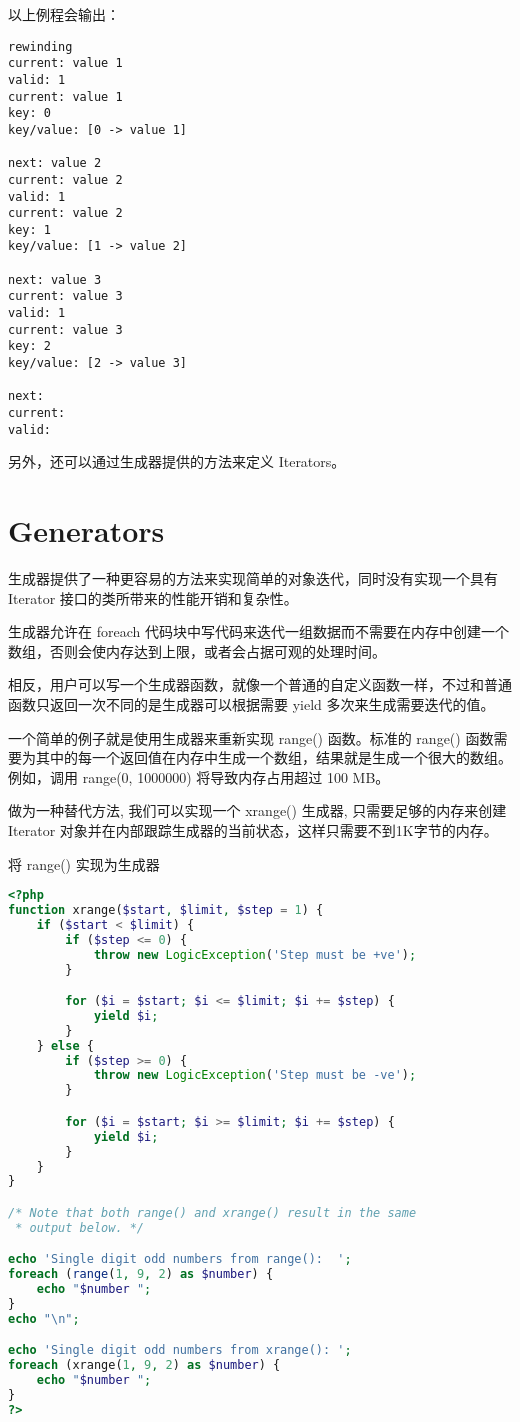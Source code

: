 以上例程会输出：

\begin{verbatim}
rewinding
current: value 1
valid: 1
current: value 1
key: 0
key/value: [0 -> value 1]

next: value 2
current: value 2
valid: 1
current: value 2
key: 1
key/value: [1 -> value 2]

next: value 3
current: value 3
valid: 1
current: value 3
key: 2
key/value: [2 -> value 3]

next:
current:
valid:
\end{verbatim}

另外，还可以通过生成器提供的方法来定义 Iterators。




\section{Generators}



生成器提供了一种更容易的方法来实现简单的对象迭代，同时没有实现一个具有 Iterator 接口的类所带来的性能开销和复杂性。

生成器允许在 foreach 代码块中写代码来迭代一组数据而不需要在内存中创建一个数组，否则会使内存达到上限，或者会占据可观的处理时间。

相反，用户可以写一个生成器函数，就像一个普通的自定义函数一样，不过和普通函数只返回一次不同的是生成器可以根据需要 yield 多次来生成需要迭代的值。

一个简单的例子就是使用生成器来重新实现 range() 函数。标准的 range() 函数需要为其中的每一个返回值在内存中生成一个数组，结果就是生成一个很大的数组。 例如，调用 range(0, 1000000) 将导致内存占用超过 100 MB。

做为一种替代方法, 我们可以实现一个 xrange() 生成器, 只需要足够的内存来创建 Iterator 对象并在内部跟踪生成器的当前状态，这样只需要不到1K字节的内存。

\begin{example}
将 range() 实现为生成器
\begin{lstlisting}[language=PHP]
<?php
function xrange($start, $limit, $step = 1) {
    if ($start < $limit) {
        if ($step <= 0) {
            throw new LogicException('Step must be +ve');
        }

        for ($i = $start; $i <= $limit; $i += $step) {
            yield $i;
        }
    } else {
        if ($step >= 0) {
            throw new LogicException('Step must be -ve');
        }

        for ($i = $start; $i >= $limit; $i += $step) {
            yield $i;
        }
    }
}

/* Note that both range() and xrange() result in the same
 * output below. */

echo 'Single digit odd numbers from range():  ';
foreach (range(1, 9, 2) as $number) {
    echo "$number ";
}
echo "\n";

echo 'Single digit odd numbers from xrange(): ';
foreach (xrange(1, 9, 2) as $number) {
    echo "$number ";
}
?>
\end{lstlisting}
\end{example}

